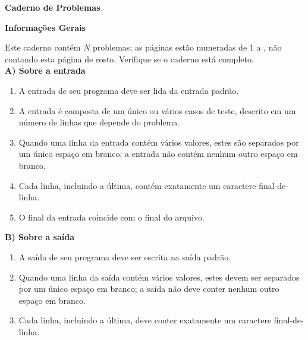 \documentclass[11pt,oneside,a4paper]{book}
\begin{document}
\begin{titlepage}
\begin{center}
\vspace{3em}
\textbf{Caderno de Problemas} \\
\end{center}

\vspace{7em}
\begin{center}
\textbf{Informações Gerais} \\
\end{center}

\noindent
Este caderno contém $N$ problemas; as páginas estão numeradas de 1 a \pageref{LastPage}, não contando esta página de rosto.
Verifique se o caderno está completo. \\

\textbf{A) Sobre a entrada}
\begin{enumerate}
\setlength{\itemsep}{0pt}
\setlength{\parskip}{0pt}
\setlength{\parsep}{0pt} 
\item A entrada de seu programa deve ser lida da entrada padrão.
\item A entrada é composta de um único ou vários casos de teste, descrito em um número de linhas que depende do problema.
\item Quando uma linha da entrada contém vários valores, estes são separados por um único espaço em branco; a
entrada não contém nenhum outro espaço em branco.
\item Cada linha, incluindo a última, contém exatamente um caractere final-de-linha.
\item O final da entrada coincide com o final do arquivo.
\end{enumerate} 

\textbf{B) Sobre a saída}
\begin{enumerate}
\setlength{\itemsep}{0pt}
\setlength{\parskip}{0pt}
\setlength{\parsep}{0pt} 
\item A saída de seu programa deve ser escrita na saída padrão.
\item Quando uma linha da saída contém vários valores, estes devem ser separados por um único espaço em branco; a saída não deve conter nenhum outro espaço em branco.
\item Cada linha, incluindo a última, deve conter exatamente um caractere final-de-linha.
\end{enumerate}

\end{titlepage}











\end{document}
